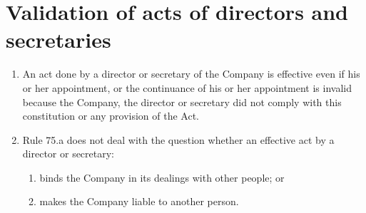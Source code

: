 \section{Validation of acts of directors and secretaries}

\begin{enumerate}[label=(\alph*)]
    \item An act done by a director or secretary of the Company is effective even if his or her appointment, or the continuance of his or her appointment is invalid because the Company, the director or secretary did not comply with this constitution or any provision of the Act.
    
    \item Rule 75.a does not deal with the question whether an effective act by a director or secretary:
    \begin{enumerate}[label=(\roman*)]
        \item binds the Company in its dealings with other people; or
        \item makes the Company liable to another person.
    \end{enumerate}
\end{enumerate} 